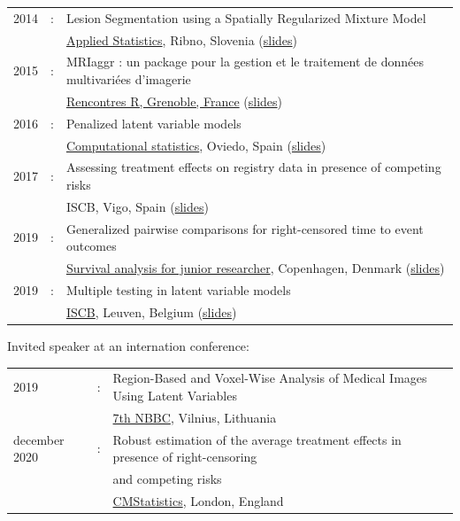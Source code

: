 \documentclass[12pt]{article}
\begin{document}
\begin{tabular}{l@{ }l@{ }l}
2014 &:& Lesion Segmentation using a Spatially Regularized Mixture Model \\
&& \href{http://conferences.nib.si/AS2014/default.htm}{Applied Statistics}, Ribno, Slovenia \hfill (\href{https://bozenne.github.io/doc/Talks/2014-Applied_statistics-Lesion_Segmentation.pdf}{slides}) \\ [3mm]
2015 &:& MRIaggr : un package pour la gestion et le traitement de données multivariées d'imagerie\\
&& \href{https://r2015-grenoble.sciencesconf.org/66037}{Rencontres R, Grenoble, France}  \hfill   (\href{https://bozenne.github.io/doc/Talks/2015-R-MRIaggr.pdf}{slides})  \\ [3mm]
2016 &:& Penalized latent variable models  \\
&& \href{http://cmstatistics.org/RegistrationsV2/COMPSTAT2016/viewSubmission.php?in=440&token=29584n1s18p97n65o7p1r5n36sopq0n4}{Computational statistics}, Oviedo, Spain \hfill (\href{https://bozenne.github.io/doc/Talks/2016-Compstat-pLVM.pdf}{slides}) \\ [3mm]
2017 &:& Assessing treatment effects on registry data in presence of competing risks \\ 
&& ISCB, Vigo, Spain \hfill (\href{https://bozenne.github.io/doc/Talks/2017-ISCB-ate.pdf}{slides}) \\ [3mm]
2019 &:& Generalized pairwise comparisons for right-censored time to event outcomes \\
&& \href{https://publicifsv.sund.ku.dk/~safjr2019/}{Survival analysis for junior researcher}, Copenhagen, Denmark \hfill (\href{https://bozenne.github.io/doc/Talks/2019-prezSAfJR-GPC.pdf}{slides}) \\ [3mm]
2019 &:& Multiple testing in latent variable models \\
&& \href{https://kuleuvencongres.be/iscb40/}{ISCB}, Leuven, Belgium \hfill (\href{https://bozenne.github.io/doc/Talks/2019-ISCB-multcomp_LVM.pdf}{slides}) \\
\end{tabular}

\bigskip

Invited speaker at an internation conference: 

\medskip

\begin{tabular}{l@{ }l@{ }l}
2019 &:& Region-Based and Voxel-Wise Analysis of Medical Images Using Latent Variables \\
&& \href{https://events.razzby.com/nbbc19/}{7th NBBC}, Vilnius, Lithuania \\
december 2020 &:& Robust estimation of the average treatment effects in presence of right-censoring \\
&& and competing risks \\
&& \href{http://www.cmstatistics.org/conferences.php}{CMStatistics}, London, England \\
\end{tabular}
\end{document}
